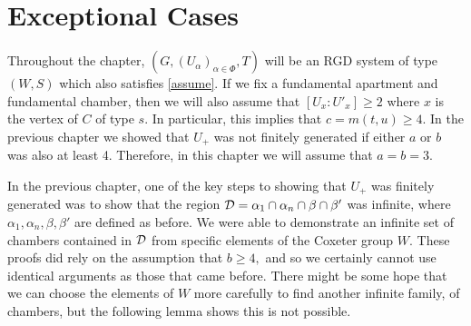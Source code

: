 \documentclass[class=book, crop=false]{standalone}
\begin{document}
\chapter{Exceptional Cases}
\label{exceptional}
Throughout the chapter, $(G,(U_\alpha)_{\alpha\in \Phi},T)$ will be an RGD system of type $(W,S)$ which also satisfies \eqref{assume}. If we fix a fundamental apartment and fundamental chamber, then we will also assume that $[U_x:U'_x]\ge 2$ where $x$ is the vertex of $C$ of type $s.$ In particular, this implies that $c=m(t,u)\ge 4.$ In the previous chapter we showed that $U_+$ was not finitely generated if either $a$ or $b$ was also at least 4. Therefore, in this chapter we will assume that $a=b=3.$ 

In the previous chapter, one of the key steps to showing that $U_+$ was finitely generated was to show that the region $\mathcal{D}=\alpha_1\cap\alpha_n\cap \beta\cap\beta'$ was infinite, where $\alpha_1,\alpha_n,\beta,\beta'$ are defined as before. We were able to demonstrate an infinite set of chambers contained in $\mathcal{D}$ from specific elements of the Coxeter group $W.$ These proofs did rely on the assumption that $b\ge 4,$ and so we certainly cannot use identical arguments as those that came before. There might be some hope that we can choose the elements of $W$ more carefully to find another infinite family, of chambers, but the following lemma shows this is not possible.
\end{document}
